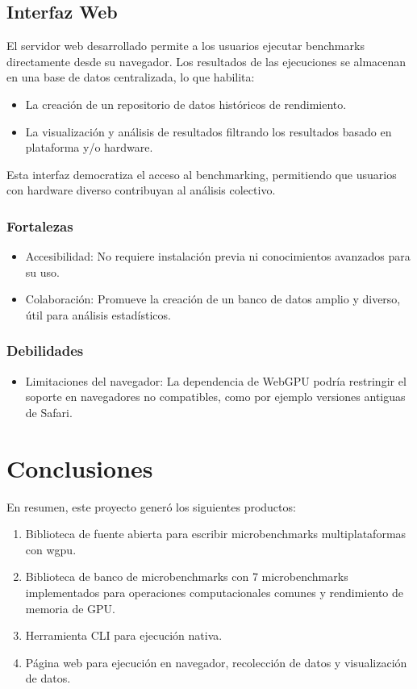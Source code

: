 \documentclass[conference]{IEEEtran}
\begin{document}
\subsection{Interfaz Web}

El servidor web desarrollado permite a los usuarios ejecutar benchmarks
directamente desde su navegador. Los resultados de las ejecuciones se almacenan
en una base de datos centralizada, lo que habilita:
\begin{itemize}
	\item La creación de un repositorio de datos históricos de rendimiento.
	\item La visualización y análisis de resultados filtrando los resultados basado
    en plataforma y/o hardware.
\end{itemize}

Esta interfaz democratiza el acceso al benchmarking, permitiendo que usuarios
con hardware diverso contribuyan al análisis colectivo.

\subsubsection{Fortalezas}
\begin{itemize}
	\item Accesibilidad: No requiere instalación previa ni conocimientos avanzados
    para su uso.
	\item Colaboración: Promueve la creación de un banco de datos amplio y diverso,
    útil para análisis estadísticos.
\end{itemize}

\subsubsection{Debilidades}
\begin{itemize}
  \item Limitaciones del navegador: La dependencia de WebGPU podría restringir
    el soporte en navegadores no compatibles, como por ejemplo versiones
    antiguas de Safari.
\end{itemize}

\section{Conclusiones}

En resumen, este proyecto generó los siguientes productos:

\begin{enumerate}
 \item Biblioteca de fuente abierta para escribir microbenchmarks multiplataformas con wgpu.
 \item Biblioteca de banco de microbenchmarks con 7 microbenchmarks implementados para operaciones computacionales comunes y rendimiento de memoria de GPU.
 \item Herramienta CLI para ejecución nativa.
 \item Página web para ejecución en navegador, recolección de datos y visualización de datos.
\end{enumerate}
\end{document}
